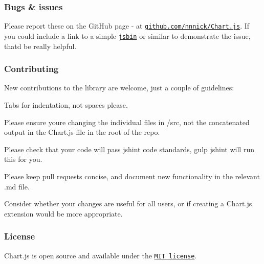 \subsubsection*{Bugs \& issues}

Please report these on the Git\+Hub page -\/ at \href{https://github.com/nnnick/Chart.js}{\tt github.\+com/nnnick/\+Chart.js}. If you could include a link to a simple \href{http://jsbin.com/}{\tt jsbin} or similar to demonstrate the issue, that\textquotesingle{}d be really helpful.

\subsubsection*{Contributing}

New contributions to the library are welcome, just a couple of guidelines\+:


\begin{DoxyItemize}
\item Tabs for indentation, not spaces please.
\item Please ensure you\textquotesingle{}re changing the individual files in {\ttfamily /src}, not the concatenated output in the {\ttfamily Chart.\+js} file in the root of the repo.
\item Please check that your code will pass {\ttfamily jshint} code standards, {\ttfamily gulp jshint} will run this for you.
\item Please keep pull requests concise, and document new functionality in the relevant {\ttfamily .md} file.
\item Consider whether your changes are useful for all users, or if creating a Chart.\+js extension would be more appropriate.
\end{DoxyItemize}

\subsubsection*{License}

Chart.\+js is open source and available under the \href{http://opensource.org/licenses/MIT}{\tt M\+IT license}. 